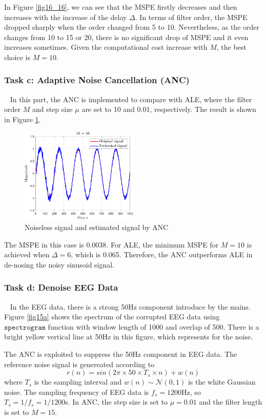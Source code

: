 \documentclass[10pt]{article}
\begin{document}
In Figure \ref{fig16_16}, we can see that the MSPE firstly decreases and then increases 
with the increase of the delay $\Delta$. In terms of filter order, the MSPE dropped sharply 
when the order changed from 5 to 10. Nevertheless, as the order changes from 10 to 15 or 20,
there is no significant drop of MSPE and it even increases sometimes. Given the
computational cost increase with $M$, the best choice is $M=10$.


\subsubsection{Task c: Adaptive Noise Cancellation (ANC)}
\ \indent
In this part, the ANC is implemented to compare with ALE, where the filter order $M$ and 
step size $\mu$ are set to 10 and 0.01, respectively. The result is shown in Figure \ref{fig17_17}.

\begin{figure}[htbp]
    \centering
	\includegraphics[width=0.5\textwidth]{fig/2.3_7.pdf}
	\caption{Noiseless signal and estimated signal by ANC}
    \label{fig17_17}
\end{figure}
The MSPE in this case is 0.0038. For ALE, the minimum MSPE for $M=10$ is achieved when $\Delta=6$, which is 0.065. 
Therefore, the ANC outperforms ALE in de-nosing the noisy sinusoid signal.

\subsubsection{Task d: Denoise EEG Data}
\ \indent
In the EEG data, there is a strong 50Hz component introduce by the mains. Figure \ref{fig15a} shows the 
spectrum of the corrupted EEG data using $\mathtt{spectrogram}$ function with window length of 
1000 and overlap of 500. There is a bright yellow vertical line at 50Hz in this figure, which represents for the 
noise.

The ANC is exploited to suppress the 50Hz component in EEG data. The reference noise signal is genereated 
according to 
\begin{equation}
	r(n) = sin(2\pi\times 50 \times T_s \times n) + w(n)
\end{equation}
where $T_s$ is the sampling interval and $w(n) \sim \mathcal{N}(0,1)$ is the white Gaussian noise.
The sampling frequency of EEG data is $f_s = 1200$Hz, so $T_s = 1/f_s = 1/1200$s. 
In ANC, the step size is set to $\mu=0.01$ and the filter length is set to $M=15$. 
\end{document}

